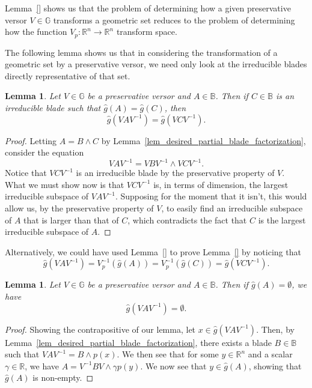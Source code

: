 \documentclass{birkjour}
\newtheorem{lem}[thm]{Lemma}
\theoremstyle{definition}
\theoremstyle{remark}
\numberwithin{equation}{section}
\newcommand{\R}{\mathbb{R}}
\newcommand{\B}{\mathbb{B}}
\newcommand{\G}{\mathbb{G}}
\newcommand{\gh}{\hat{g}}
\begin{document}
Lemma~\ref{} shows us that the problem of determining how a given preservative
versor $V\in\G$ transforms a geometric set reduces to the problem of determining
how the function $V_p:\R^n\to\R^n$ transform space.

The following lemma shows us that in considering the transformation of a geometric set
by a preservative versor, we need only look at the irreducible blades directly representative of that set.

\begin{lem}
Let $V\in\G$ be a preservative versor and $A\in\B$.
Then if $C\in\B$ is an irreducible blade such that $\gh(A)=\gh(C)$, then
\begin{equation}\label{equ_transformed_reducible_is_transformed_irreducible}
\gh(VAV^{-1})=\gh(VCV^{-1}).
\end{equation}
\end{lem}
\begin{proof}
Letting $A=B\wedge C$ by Lemma~\ref{lem_desired_partial_blade_factorization}, consider the equation
\begin{equation}
VAV^{-1} = VBV^{-1}\wedge VCV^{-1}.
\end{equation}
Notice that $VCV^{-1}$ is an irreducible blade by the preservative property of $V$.
What we must show now is
that $VCV^{-1}$ is, in terms of dimension, the largest irreducible subspace of $VAV^{-1}$.  Supposing for the moment that it isn't,
this would allow us, by the preservative property of $V$, to easily find an irreducible subspace of $A$ that is larger than that of $C$,
which contradicts the fact that $C$ is the largest irreducible subspace of $A$.
\end{proof}

Alternatively, we could have used Lemma~\ref{} to prove Lemma~\ref{} by noticing
that
\begin{equation}
\gh(VAV^{-1})=V_p^{-1}(\gh(A))=V_p^{-1}(\gh(C))=\gh(VCV^{-1}).
\end{equation}

\begin{lem}\label{lem_empty_blade_transforms_as_empty_blade}
Let $V\in\G$ be a preservative versor and $A\in\B$.  Then if $\gh(A)=\emptyset$, we have
\begin{equation}
\gh(VAV^{-1})=\emptyset.
\end{equation}
\end{lem}
\begin{proof}
Showing the contrapositive of our lemma, let $x\in\gh(VAV^{-1})$.  Then, by Lemma~\ref{lem_desired_partial_blade_factorization},
there exists a blade $B\in\B$ such that $VAV^{-1}=B\wedge p(x)$.  We then see that for
some $y\in\R^n$ and a scalar $\gamma\in\R$, we have
$A = V^{-1}BV\wedge \gamma p(y)$.
We now see that $y\in\gh(A)$, showing that $\gh(A)$ is non-empty.
\end{proof}
\end{document}
